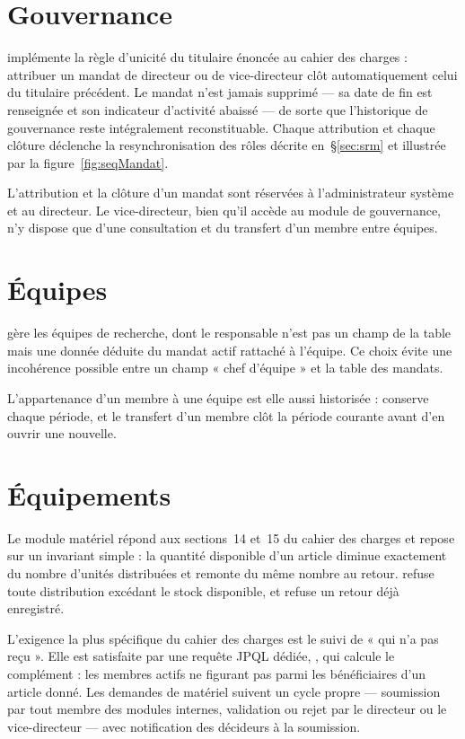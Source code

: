\section{Gouvernance}

 implémente la règle d'unicité du titulaire énoncée au cahier des
charges : attribuer un mandat de directeur ou de vice-directeur clôt automatiquement celui
du titulaire précédent. Le mandat n'est jamais supprimé --- sa date de fin est renseignée
et son indicateur d'activité abaissé --- de sorte que l'historique de gouvernance reste
intégralement reconstituable. Chaque attribution et chaque clôture déclenche la
resynchronisation des rôles décrite en~§\ref{sec:srm} et illustrée par la
figure~\ref{fig:seqMandat}.

L'attribution et la clôture d'un mandat sont réservées à l'administrateur système et au
directeur. Le vice-directeur, bien qu'il accède au module de gouvernance, n'y dispose que
d'une consultation et du transfert d'un membre entre équipes.

\section{Équipes}

 gère les équipes de recherche, dont le responsable n'est pas un champ de
la table mais une donnée déduite du mandat  actif rattaché à l'équipe.
Ce choix évite une incohérence possible entre un champ « chef d'équipe » et la table des
mandats.

L'appartenance d'un membre à une équipe est elle aussi historisée :
 conserve chaque période, et le transfert d'un membre clôt la
période courante avant d'en ouvrir une nouvelle.

\section{Équipements}

Le module matériel répond aux sections~14 et~15 du cahier des charges et repose sur un
invariant simple : la quantité disponible d'un article diminue exactement du nombre
d'unités distribuées et remonte du même nombre au retour. 
refuse toute distribution excédant le stock disponible, et  refuse
un retour déjà enregistré.

L'exigence la plus spécifique du cahier des charges est le suivi de « qui n'a pas reçu ».
Elle est satisfaite par une requête JPQL dédiée, ,
qui calcule le complément : les membres actifs ne figurant pas parmi les bénéficiaires
d'un article donné. Les demandes de matériel suivent un cycle propre --- soumission par
tout membre des modules internes, validation ou rejet par le directeur ou le
vice-directeur --- avec notification des décideurs à la soumission.

